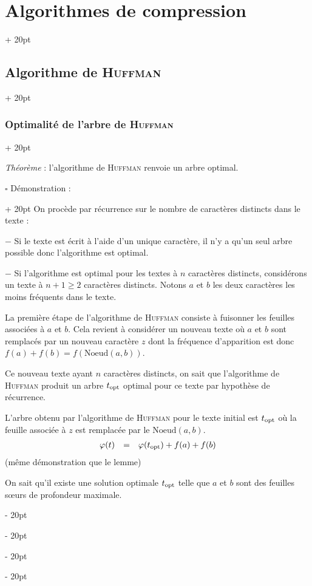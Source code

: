 \documentclass[a4paper, 12pt, twoside]{article}
\renewcommand{\ge}{\geqslant}
\newcommand{\ind}[1][20pt]{\advance\leftskip + #1}
\newcommand{\deind}[1][20pt]{\advance\leftskip - #1}
\newenvironment{indt}[2][20pt]{#2 \par \ind[#1]}{\par \deind} %
\begin{document}
\begin{indt}{\section{Algorithmes de compression}}
\begin{indt}{\subsection{Algorithme de \textsc{Huffman}}}
\begin{indt}{\subsubsection{Optimalité de l'arbre de \textsc{Huffman}}}
                \vspace{12pt}
                
                \begin{pseudocode}
                    \textit{Théorème} :
                    l'algorithme de \textsc{Huffman} renvoie un arbre optimal.
                \end{pseudocode}

                \vspace{12pt}
                
                \begin{indt}{$\square$ Démonstration :}
                    On procède par récurrence sur le nombre de caractères distincts dans le texte :

                    $-$ Si le texte est écrit à l'aide d'un unique caractère, il n'y a qu'un seul arbre possible donc l'algorithme est optimal.

                    $-$ Si l'algorithme est optimal pour les textes à $n$ caractères distincts, considérons un texte à $n + 1 \ge 2$ caractères distincts.
                    Notons $a$ et $b$ les deux caractères les moins fréquents dans le texte.

                    La première étape de l'algorithme de \textsc{Huffman} consiste à fuisonner les feuilles associées à $a$ et $b$.
                    Cela revient à considérer un nouveau texte où $a$ et $b$ sont remplacés par un nouveau caractère $z$ dont la fréquence d'apparition est donc $f(a) + f(b) = f(\mathrm{Noeud}(a, b))$.

                    Ce nouveau texte ayant $n$ caractères distincts, on sait que l'algorithme de \textsc{Huffman} produit un arbre $t_{\rm opt}$ optimal pour ce texte par hypothèse de récurrence.

                    L'arbre obtenu par l'algorithme de \textsc{Huffman} pour le texte initial est $t_{\rm opt}$ où la feuille associée à $z$ est remplacée par le $\mathrm{Noeud}(a, b)$.
                    \[
                        \begin{array}{rcl}
                            \varphi(t)
                            &=& \displaystyle
                            \varphi(t_{\rm opt})
                            + f(a)
                            + f(b)
                        \end{array}
                    \]
                    (même démonstration que le lemme)

                    On sait qu'il existe une solution optimale $t_{\rm opt}$ telle que $a$ et $b$ sont des feuilles s\oe urs de profondeur maximale.


\end{indt}
\end{indt}
\end{indt}
\end{indt}
\end{document}
